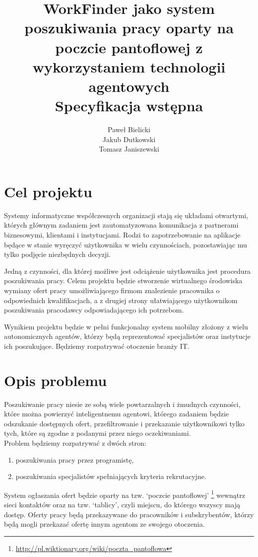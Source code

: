 \documentclass[11pt,a4paper]{article}
\author{
	Paweł Bielicki\\
	Jakub Dutkowski\\
	Tomasz Janiszewski
}
\title{
	\huge{WorkFinder jako system poszukiwania pracy oparty na poczcie pantoflowej z wykorzystaniem technologii agentowych}\\
	\LARGE{Specyfikacja wstępna}
 }
\begin{document}
\maketitle

\listoftodos
\newpage


\section{Cel projektu}
Systemy informatyczne współczesnych organizacji stają się układami otwartymi, których głównym zadaniem jest zautomatyzowana komunikacja z partnerami biznesowymi, klientami i instytucjami. Rodzi to zapotrzebowanie na aplikacje będące w stanie wyręczyć użytkownika w wielu czynnościach, pozostawiając mu tylko podjęcie niezbędnych decyzji.

Jedną z czynności, dla której możliwe jest odciążenie użytkownika jest procedura poszukiwania pracy. Celem projektu będzie stworzenie wirtualnego środowiska wymiany ofert pracy umożliwiającego firmom znalezienie pracownika o odpowiednich kwalifikacjach, a z drugiej strony ułatwiającego użytkownikom poszukiwania pracodawcy odpowiadającego ich potrzebom.

Wynikiem projektu będzie w pełni funkcjonalny system mobilny złożony z wielu autonomicznych agentów, którzy będą reprezentować specjalistów oraz instytucje ich poszukujące. Będziemy rozpatrywać otoczenie branży IT.


\section{Opis problemu}
Poszukiwanie pracy niesie ze sobą wiele powtarzalnych i żmudnych czynności, które można powierzyć inteligentnemu agentowi, którego zadaniem będzie odszukanie dostępnych ofert, przefiltrowanie i przekazanie użytkownikowi tylko tych, które są zgodne z podanymi przez niego oczekiwaniami.
\\
Problem będziemy rozpatrywać z dwóch stron:
\begin{enumerate}
	\item poszukiwania pracy przez programistę,
	\item poszukiwania specjalistów spełniających kryteria rekrutacyjne.
\end{enumerate}

System ogłaszania ofert będzie oparty na tzw. `poczcie pantoflowej' \footnote{\url{http://pl.wiktionary.org/wiki/poczta_pantoflowa}} wewnątrz sieci kontaktów oraz na tzw. `tablicy', czyli miejscu, do którego wszyscy mają dostęp. Oferty pracy będą przekazywane do pracowników i subskrybentów, którzy będą mogli przekazać ofertę innym agentom ze swojego otoczenia.
\end{document}
